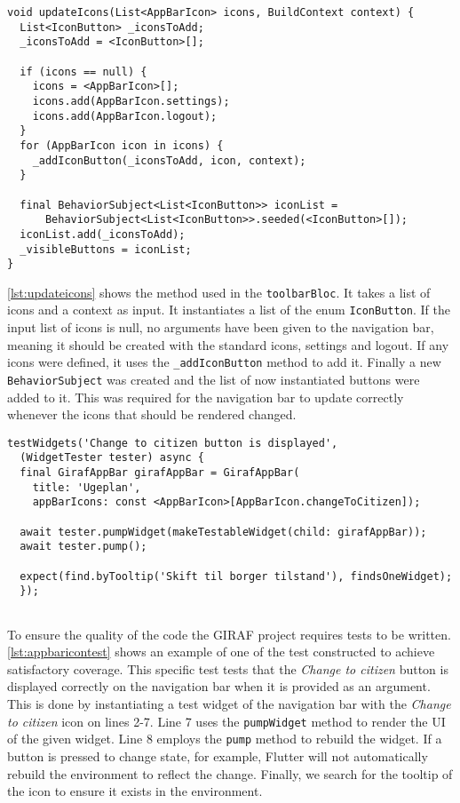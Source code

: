 \begin{lstlisting}[caption={Updating the icons in the appbar},label={lst:updateicons}]
  void updateIcons(List<AppBarIcon> icons, BuildContext context) {
  List<IconButton> _iconsToAdd;
  _iconsToAdd = <IconButton>[];

  if (icons == null) {
    icons = <AppBarIcon>[];
    icons.add(AppBarIcon.settings);
    icons.add(AppBarIcon.logout);
  }
  for (AppBarIcon icon in icons) {
    _addIconButton(_iconsToAdd, icon, context);
  }

  final BehaviorSubject<List<IconButton>> iconList =
      BehaviorSubject<List<IconButton>>.seeded(<IconButton>[]);
  iconList.add(_iconsToAdd);
  _visibleButtons = iconList;
}
\end{lstlisting}
\autoref{lst:updateicons} shows the method used in the \texttt{toolbarBloc}.
It takes a list of icons and a context as input.
It instantiates a list of the enum \texttt{IconButton}.
If the input list of icons is null, no arguments have been given to the navigation bar, meaning it should be created with the standard icons, settings and logout.
If any icons were defined, it uses the \texttt{\_addIconButton} method to add it.
Finally a new \texttt{BehaviorSubject} was created and the list of now instantiated buttons were added to it.
This was required for the navigation bar to update correctly whenever the icons that should be rendered changed.

\begin{lstlisting}[caption={Testing the appbar with certain icons},label={lst:appbaricontest}]
  testWidgets('Change to citizen button is displayed',
  (WidgetTester tester) async {
  final GirafAppBar girafAppBar = GirafAppBar(
    title: 'Ugeplan',
    appBarIcons: const <AppBarIcon>[AppBarIcon.changeToCitizen]);
  
  await tester.pumpWidget(makeTestableWidget(child: girafAppBar));
  await tester.pump();
  
  expect(find.byTooltip('Skift til borger tilstand'), findsOneWidget);
  });
  
\end{lstlisting}
To ensure the quality of the code the GIRAF project requires tests to be written.
\autoref{lst:appbaricontest} shows an example of one of the test constructed to achieve satisfactory coverage.
This specific test tests that the \textit{Change to citizen} button is displayed correctly on the navigation bar when it is provided as an argument.
This is done by instantiating a test widget of the navigation bar with the \textit{Change to citizen} icon on lines 2-7.
Line 7 uses the \texttt{pumpWidget} method to render the UI of the given widget.
Line 8 employs the \texttt{pump} method to rebuild the widget.
If a button is pressed to change state, for example, Flutter will not automatically rebuild the environment to reflect the change.
Finally, we search for the tooltip of the icon to ensure it exists in the environment.

